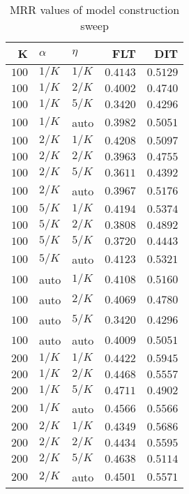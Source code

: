 
\begin{table}
\begin{spacing}{1.2}
\centering
\caption{MRR values of \bookkeeper model construction sweep}
\label{table:bookkeeper_model_sweep}
\vspace{0.2em}
\parbox{.45\linewidth}{\centering \begin{tabular}{rll|rr}
\toprule
    K &  $\alpha$ &    $\eta$ &      FLT &      DIT \\
\midrule
$100$ &  $1/K$ &  $1/K$ & $0.4143$ & $0.5129$ \\
$100$ &  $1/K$ &  $2/K$ & $0.4002$ & $0.4740$ \\
$100$ &  $1/K$ &  $5/K$ & $0.3420$ & $0.4296$ \\
$100$ &  $1/K$ &   auto & $0.3982$ & $0.5051$ \\
$100$ &  $2/K$ &  $1/K$ & $0.4208$ & $0.5097$ \\
$100$ &  $2/K$ &  $2/K$ & $0.3963$ & $0.4755$ \\
$100$ &  $2/K$ &  $5/K$ & $0.3611$ & $0.4392$ \\
$100$ &  $2/K$ &   auto & $0.3967$ & $0.5176$ \\
$100$ &  $5/K$ &  $1/K$ & $0.4194$ & $0.5374$ \\
$100$ &  $5/K$ &  $2/K$ & $0.3808$ & $0.4892$ \\
$100$ &  $5/K$ &  $5/K$ & $0.3720$ & $0.4443$ \\
$100$ &  $5/K$ &   auto & $0.4123$ & $0.5321$ \\
$100$ &   auto &  $1/K$ & $0.4108$ & $0.5160$ \\
$100$ &   auto &  $2/K$ & $0.4069$ & $0.4780$ \\
$100$ &   auto &  $5/K$ & $0.3420$ & $0.4296$ \\
$100$ &   auto &   auto & $0.4009$ & $0.5051$ \\
$200$ &  $1/K$ &  $1/K$ & $0.4422$ & $0.5945$ \\
$200$ &  $1/K$ &  $2/K$ & $0.4468$ & $0.5557$ \\
$200$ &  $1/K$ &  $5/K$ & $0.4711$ & $0.4902$ \\
$200$ &  $1/K$ &   auto & $0.4566$ & $0.5566$ \\
$200$ &  $2/K$ &  $1/K$ & $0.4349$ & $0.5686$ \\
$200$ &  $2/K$ &  $2/K$ & $0.4434$ & $0.5595$ \\
$200$ &  $2/K$ &  $5/K$ & $0.4638$ & $0.5114$ \\
$200$ &  $2/K$ &   auto & $0.4501$ & $0.5571$ \\

\end{tabular}}
\end{spacing}
\end{table}
